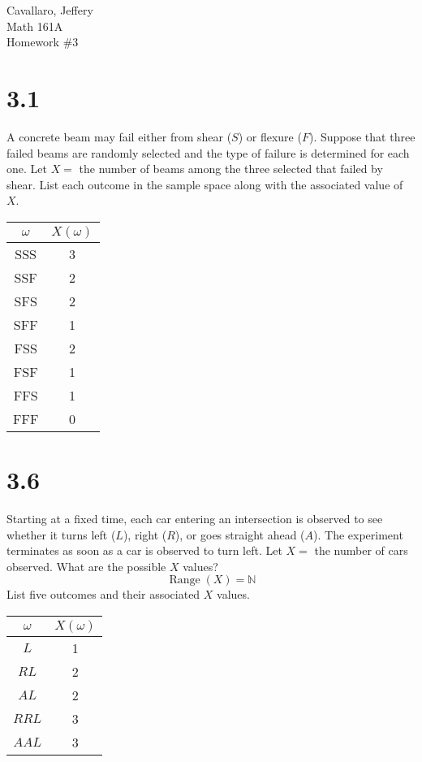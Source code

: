 \documentclass[letterpaper,12pt,fleqn]{article}
\DeclareMathOperator{\range}{Range}
\begin{document}
Cavallaro, Jeffery \\
Math 161A \\
Homework \#3

\bigskip

\section*{3.1}

A concrete beam may fail either from shear (\(S\)) or flexure (\(F\)).  Suppose that three failed beams are randomly selected
and the type of failure is determined for each one.  Let \(X=\) the number of beams among the three selected that failed by
shear.  List each outcome in the sample space along with the associated value of \(X\).

\bigskip

\begin{center}
  \begin{tabular}{|c|c|}
    \hline
    \(\omega\) & \(X(\omega)\) \\
    \hline
    SSS & 3 \\
    \hline
    SSF & 2 \\
    \hline
    SFS & 2 \\
    \hline
    SFF & 1 \\
    \hline
    FSS & 2 \\
    \hline
    FSF & 1 \\
    \hline
    FFS & 1 \\
    \hline
    FFF & 0 \\
    \hline
  \end{tabular}
\end{center}

\section*{3.6}

Starting at a fixed time, each car entering an intersection is observed to see whether it turns left (\(L\)), right (\(R\)),
or goes straight ahead (\(A\)).  The experiment terminates as soon as a car is observed to turn left.  Let \(X=\) the number
of cars observed.  What are the possible \(X\) values?
\[\range(X)=\mathbb{N}\]
List five outcomes and their associated \(X\) values.

\bigskip

\begin{center}
  \begin{tabular}{|c|c|}
    \hline
    \(\omega\) & \(X(\omega)\) \\
    \hline
    \(L\) & 1 \\
    \hline
    \(RL\) & 2 \\
    \hline
    \(AL\) & 2 \\
    \hline
    \(RRL\) & 3 \\
    \hline
    \(AAL\) & 3 \\
    \hline
  \end{tabular}
\end{center}
\end{document}
